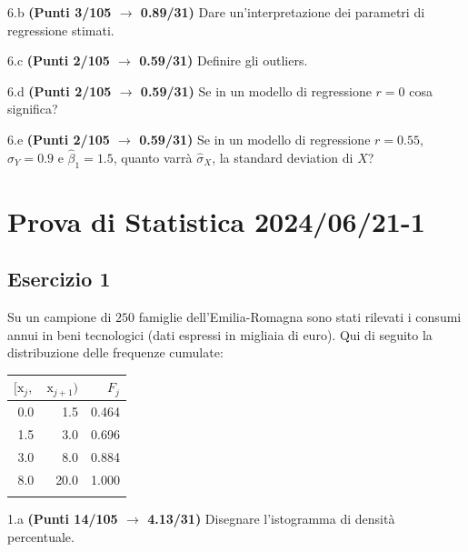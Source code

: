 \documentclass[
  11pt,
]{book}
\theoremstyle{mytheoremstyle}
\theoremstyle{mydefstyle}
\begin{document}
6.b \textbf{(Punti 3/105 \(\rightarrow\) 0.89/31)} Dare un'interpretazione dei parametri di regressione stimati.

6.c \textbf{(Punti 2/105 \(\rightarrow\) 0.59/31)} Definire gli outliers.

6.d \textbf{(Punti 2/105 \(\rightarrow\) 0.59/31)} Se in un modello di regressione \(r=0\) cosa significa?

6.e \textbf{(Punti 2/105 \(\rightarrow\) 0.59/31)} Se in un modello di regressione \(r=0.55\), \(\hat\sigma_Y=0.9\) e \(\hat\beta_1=1.5\), quanto varrà
\(\hat\sigma_X\), la standard deviation di \(X\)?

\section{Prova di Statistica 2024/06/21-1}\label{prova-di-statistica-20240621-1}

\subsection{Esercizio 1}\label{esercizio-1-37}

Su un campione di \(250\) famiglie dell'Emilia-Romagna sono stati rilevati i consumi annui in beni tecnologici (dati espressi in migliaia di euro). Qui di seguito la distribuzione delle frequenze cumulate:

\begin{table}[H]
\centering
\begin{tabular}{rrr}
\toprule
$[\text{x}_j,$ & $\text{x}_{j+1})$ & $F_j$\\
\midrule
0.0 & 1.5 & 0.464\\
1.5 & 3.0 & 0.696\\
3.0 & 8.0 & 0.884\\
8.0 & 20.0 & 1.000\\
 &  & \\
\bottomrule
\end{tabular}
\end{table}

1.a \textbf{(Punti 14/105 \(\rightarrow\) 4.13/31)} Disegnare l'istogramma di densità percentuale.
\end{document}

